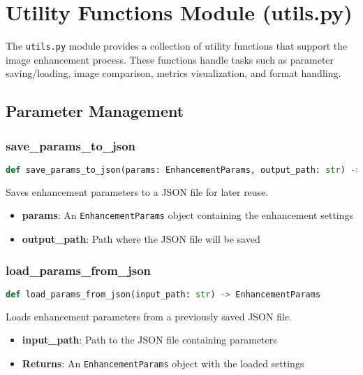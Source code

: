 \section{Utility Functions Module (utils.py)}

The \texttt{utils.py} module provides a collection of utility functions that support the image enhancement process. These functions handle tasks such as parameter saving/loading, image comparison, metrics visualization, and format handling.

\subsection{Parameter Management}

\subsubsection{save\_params\_to\_json}
\begin{lstlisting}[language=Python]
def save_params_to_json(params: EnhancementParams, output_path: str) -> None
\end{lstlisting}

Saves enhancement parameters to a JSON file for later reuse.

\begin{itemize}
  \item \textbf{params}: An \texttt{EnhancementParams} object containing the enhancement settings
  \item \textbf{output\_path}: Path where the JSON file will be saved
\end{itemize}

\subsubsection{load\_params\_from\_json}
\begin{lstlisting}[language=Python]
def load_params_from_json(input_path: str) -> EnhancementParams
\end{lstlisting}

Loads enhancement parameters from a previously saved JSON file.

\begin{itemize}
  \item \textbf{input\_path}: Path to the JSON file containing parameters
  \item \textbf{Returns}: An \texttt{EnhancementParams} object with the loaded settings
\end{itemize}

